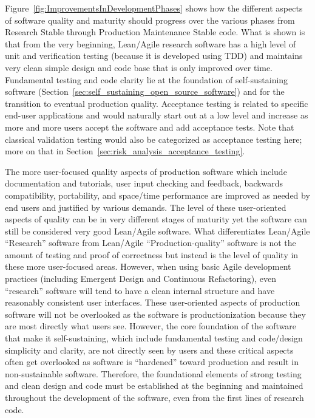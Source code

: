 \documentclass[11pt]{SANDreport}
\begin{document}
Figure~\ref{fig:ImprovementsInDevelopmentPhases} shows how the
different aspects of software quality and maturity should progress
over the various phases from Research Stable through Production
Maintenance Stable code.  What is shown is that from the very
beginning, Lean/Agile research software has a high level of unit and
verification testing (because it is developed using TDD) and maintains
very clean simple design and code base that is only improved over
time.  Fundamental testing and code clarity lie at the foundation of
self-sustaining software
(Section~\ref{sec:self_sustaining_open_source_software}) and for the
transition to eventual production quality.  Acceptance testing is
related to specific end-user applications and would naturally start
out at a low level and increase as more and more users accept the
software and add acceptance tests.  Note that classical validation
testing would also be categorized as acceptance testing here; more on
that in Section~\ref{sec:risk_analysis_acceptance_testing}.

The more user-focused quality aspects of production software which
include documentation and tutorials, user input checking and feedback,
backwards compatibility, portability, and space/time performance are
improved as needed by end users and justified by various demands.  The
level of these user-oriented aspects of quality can be in very
different stages of maturity yet the software can still be considered
very good Lean/Agile software.  What differentiates Lean/Agile
``Research'' software from Lean/Agile ``Production-quality'' software
is not the amount of testing and proof of correctness but instead is
the level of quality in these more user-focused areas.  However, when
using basic Agile development practices (including Emergent Design and
Continuous Refactoring), even ``research'' software will tend to have
a clean internal structure and have reasonably consistent user
interfaces.  These user-oriented aspects of production software will
not be overlooked as the software is productionization because they are
most directly what users see.  However, the core foundation of the
software that make it self-sustaining, which include fundamental
testing and code/design simplicity and clarity, are not directly seen
by users and these critical aspects often get overlooked as software
is ``hardened'' toward production and result in non-sustainable
software.  Therefore, the foundational elements of strong testing and
clean design and code must be established at the beginning and
maintained throughout the development of the software, even from the
first lines of research code.
\end{document}
